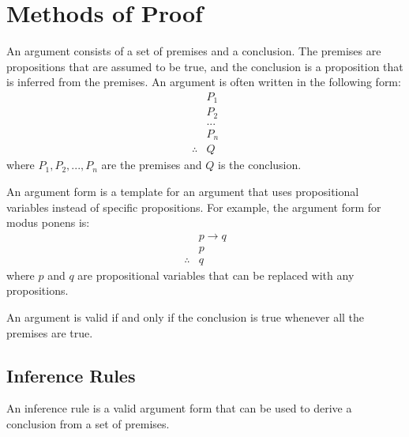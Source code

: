 \chapter{Methods of Proof}
\begin{definition}[Argument]
    An argument consists of a set of premises and a conclusion. The premises are propositions that are assumed to be true, and the conclusion is a proposition that is inferred from the premises. An argument is often written in the following form:
    \[
        \begin{array}{rl}
            & P_1 \\
            & P_2 \\
            & ... \\
            & P_n \\
            \hline
            \therefore & Q
        \end{array}
    \]
    where $P_1, P_2, ..., P_n$ are the premises and $Q$ is the conclusion.
\end{definition}

\begin{definition}
    An argument form is a template for an argument that uses propositional variables instead of specific propositions. For example, the argument form for modus ponens is:
    \[
        \begin{array}{rl}
            & p \to q \\
            & p \\
            \hline
            \therefore & q
        \end{array}
    \]
    where $p$ and $q$ are propositional variables that can be replaced with any propositions.
\end{definition}

\begin{definition}
    An argument is valid if and only if the conclusion is true whenever all the premises are true.
\end{definition}

    

\section{Inference Rules}
\begin{definition}
    An inference rule is a valid argument form that can be used to derive a conclusion from a set of premises.
\end{definition}

